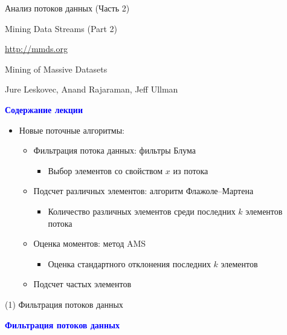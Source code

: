 \documentclass[landscape]{slides}
\begin{document}
\begin{normalsize}


\begin{slide}
\begin{center}
Анализ потоков данных (Часть 2)

Mining Data Streams (Part 2)

\url{http://mmds.org}

Mining of Massive Datasets

Jure Leskovec, Anand Rajaraman, Jeff Ullman
\end{center}
\end{slide}


\begin{slide}
\textbf{\textcolor{blue}{Содержание лекции}}

\begin{itemize}
\item Новые поточные алгоритмы:
  \begin{itemize}
  \item Фильтрация потока данных: фильтры Блума
    \begin{itemize}
    \item Выбор элементов со свойством $x$ из потока
    \end{itemize}
  \item Подсчет различных элементов: алгоритм Флажоле--Мартена
    \begin{itemize}
    \item Количество различных элементов среди последних $k$ элементов потока
    \end{itemize}
  \item Оценка моментов: метод AMS
    \begin{itemize}
    \item Оценка стандартного отклонения последних $k$ элементов
    \end{itemize}
  \item Подсчет частых элементов
  \end{itemize}
\end{itemize}
\end{slide}

\begin{slide}
(1) Фильтрация потоков данных
\end{slide}


\begin{slide}
\textbf{\textcolor{blue}{Фильтрация потоков данных}}


\end{slide}
\end{normalsize}
\end{document}
